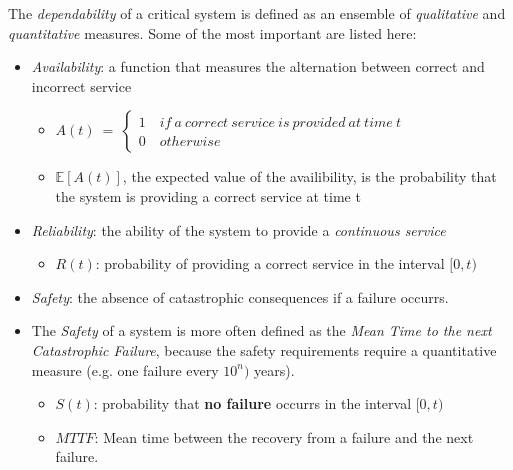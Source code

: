 The \textsl{dependability} of a critical system is defined as an ensemble of \textsl{qualitative} and \textsl{quantitative} measures.
Some of the most important are listed here:

\begin{itemize}
	\item \textsl{Availability}: a function that measures the alternation between correct and incorrect service
	\vspace{0.4cm}
	\begin{itemize}
		\item[]
	$
		A(t)\: =\: \begin{cases}
		1\quad if\: a\ correct\: service\: is\: provided\: at\: time\: t \\
		0\quad otherwise
		\end{cases}
	$
	\vspace{0.2cm}
		\item[] $\mathbb{E}[A(t)]$, the expected value of the availibility, is the probability that the system is providing a correct service at time t
	\end{itemize}
\end{itemize}

\begin{itemize}
	\item \textsl{Reliability}: the ability of the system to provide a \textsl{continuous service}
	\vspace{0.4cm}
	\begin{itemize}
		\item[] $R(t)$: probability of providing a correct service in the interval $[0, t)$
	\end{itemize}
\end{itemize}

\begin{itemize}
	\item \textsl{Safety}: the absence of catastrophic consequences if a failure occurrs.
	\item The \textsl{Safety} of a system is more often defined as the \textsl{Mean Time to the next Catastrophic Failure}, because the safety requirements require a quantitative measure (e.g. one failure every $10^{n})$ years).
	\vspace{0.4cm}
	\begin{itemize}
		\item[] $S(t)$: probability that \textbf{no failure} occurrs in the interval $[0,t)$
		\vspace{0.2cm}
		\item[] $MTTF$: Mean time between the recovery from a failure and the next failure.
	\end{itemize}
\end{itemize}

